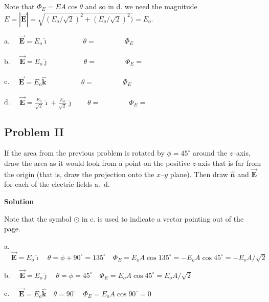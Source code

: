 \documentclass{article}
\newcommand{\ds}[0]{\displaystyle}
\newcommand{\ihat}[0]{\hat{\boldsymbol{\imath}}}
\newcommand{\jhat}[0]{\hat{\boldsymbol{\jmath}}}
\newcommand{\khat}[0]{\hat{\boldsymbol{k}}}
\newcommand{\bfvec}[1]{\vec{\mathbf{#1}}}
\begin{document}
\begin{enumerate}
        Note that $\Phi_E=EA\cos\theta$ and so in d. we need the magnitude $E = |\bfvec{E}| = \sqrt{(E_o/\sqrt{2})^2+(E_o/\sqrt{2})^2)}=E_o$.
        \else

        

        a. $\quad\ds\bfvec{E}=E_o\ihat\qquad\phantom{+\frac{E_o}{\sqrt{2}}\jhat}\theta=\qquad\qquad\Phi_E$

        b. $\quad\ds\bfvec{E}=E_o\jhat\qquad\phantom{+ \frac{E_o}{\sqrt{2}}\jhat}\theta=\qquad\qquad\Phi_E=$ 

        c. $\quad\ds\bfvec{E}=E_o\khat\qquad\phantom{+\frac{E_o}{\sqrt{2}}\jhat}\theta=\qquad\qquad\Phi_E$ 

        d. $\quad\ds\bfvec{E}=\frac{E_o}{\sqrt{2}}\ihat + \frac{E_o}{\sqrt{2}}\jhat\qquad\theta=\qquad\qquad\Phi_E=$

        \newpage
        \fi

\end{enumerate}

\subsection{Problem II}

\ifsolutions

\else


\fi

If the area from the previous problem is rotated by $\phi=45^\circ$ around the $z$--axis, draw the area as it would look from a point on the positive $z$-axis that is far from the origin (that is, draw the projection onto the $x$--$y$ plane). Then draw $\hat{\mathbf{n}}$ and $\bfvec{E}$ for each of the electric fields a.--d.

\ifsolutions
\textbf{Solution} 

Note that the symbol $\odot$ in c. is used to indicate a vector pointing out of the page.



a. $\quad\ds\bfvec{E}=E_o\ihat\quad\theta=\phi+90^\circ=135^\circ\quad\Phi_E=E_oA\cos 135^\circ=-E_oA\cos 45^\circ=-E_oA/\sqrt{2}$

b. $\quad\ds\bfvec{E}=E_o\jhat\quad\theta=\phi=45^\circ\quad\Phi_E=E_oA\cos 45^\circ=E_oA/\sqrt{2}$ 

c. $\quad\ds\bfvec{E}=E_o\khat\quad\theta=90^\circ\quad\Phi_E=E_oA\cos 90^\circ=0$ 
\end{document}
